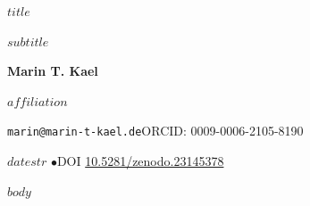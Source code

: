 \documentclass[11pt]{article}
\begin{document}
\begin{center}
{\LARGE\bfseries $title$\par}
\vspace{4pt}
{\large $subtitle$\par}
\vspace{14pt}
{\large\bfseries Marin T. Kael\par}
\vspace{2pt}
$affiliation$\par
\texttt{marin@marin-t-kael.de}\quad ORCID: 0009-0006-2105-8190\par
\vspace{12pt}
{\large $datestr$ \quad$\bullet$\quad DOI \href{https://doi.org/10.5281/zenodo.23145378}{10.5281/zenodo.23145378}\par}
\end{center}
\vspace{6pt}
\begin{abstract}
$abstract$
\end{abstract}
$body$
\end{document}

